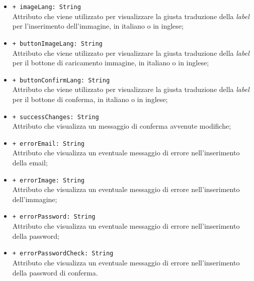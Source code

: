 \begin{itemize}
\begin{itemize}
		\item \texttt{+ imageLang: String} \\ Attributo che viene utilizzato per visualizzare la giusta traduzione della \textit{label} per l'inserimento dell'immagine, in italiano o in inglese;
		\item \texttt{+ buttonImageLang: String} \\ Attributo che viene utilizzato per visualizzare la giusta traduzione della \textit{label} per il bottone di caricamento immagine, in italiano o in inglese;
		\item \texttt{+ buttonConfirmLang: String} \\ Attributo che viene utilizzato per visualizzare la giusta traduzione della \textit{label} per il bottone di conferma, in italiano o in inglese;
		\item \texttt{+ successChanges: String} \\ Attributo che visualizza un messaggio di conferma avvenute modifiche;
		\item \texttt{+ errorEmail: String} \\ Attributo che visualizza un eventuale messaggio di errore nell'inserimento della email;
		\item \texttt{+ errorImage: String} \\ Attributo che visualizza un eventuale messaggio di errore nell'inserimento dell'immagine;
		\item \texttt{+ errorPassword: String} \\ Attributo che visualizza un eventuale messaggio di errore nell'inserimento della password;
		\item \texttt{+ errorPasswordCheck: String} \\ Attributo che visualizza un eventuale messaggio di errore nell'inserimento della password di conferma.
	\end{itemize}
\end{itemize}


